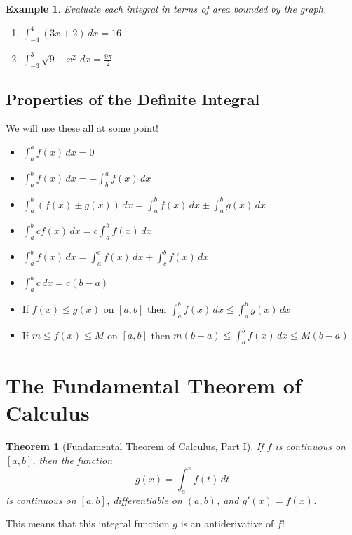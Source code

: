 \documentclass[letterpaper, 11pt, openany]{book}
\theoremstyle{mytheoremstyle}
\newtheorem{theorem}{Theorem}[section]
\theoremstyle{myexamplestyle}
\newtheorem{example}{Example}[section]
\begin{document}
\begin{example}
    Evaluate each integral in terms of area bounded by the graph.
    \begin{enumerate}
        \item \(\int_{-4}^{4} (3x + 2) \, dx = 16\)
        \item \(\int_{-3}^{3} \sqrt{9-x^{2}} \, dx = \frac{9\pi}{2}\)
    \end{enumerate}
\end{example}

\subsection{Properties of the Definite Integral}
We will use these all at some point!

\begin{itemize}
    \item \(\displaystyle \int_a^a f(x) \, dx = 0\) \faMeh
    \item \(\displaystyle \int_a^b f(x) \, dx = - \int_b^a f(x) \, dx\)
    \item \(\displaystyle \int_a^b (f(x)  \pm g(x)) \, dx = \int_a^b f(x) \, dx \pm \int_a^b g(x) \, dx\)
    \item \(\displaystyle \int_a^b c f(x) \, dx = c \int_a^b f(x) \, dx\)
    \item \(\displaystyle \int_a^b f(x) \, dx = \int_a^c f(x) \, dx + \int_c^b f(x) \, dx\)
    \item \(\displaystyle \int_a^b c \, dx = c(b-a)\)
    \item If \(f(x) \leq g(x)\) on \([a,b]\) then \(\displaystyle \int_a^b f(x) \, dx \leq \int_a^b g(x) \, dx\)
    \item If \(m \leq f(x) \leq M\) on \([a,b]\) then \(\displaystyle m(b-a) \leq \int_a^b f(x) \, dx \leq M(b-a)\)
\end{itemize}
\section{The Fundamental Theorem of Calculus}
\begin{theorem}[Fundamental Theorem of Calculus, Part I]\label{t:FTOC-I}
    If \(f\) is continuous on \([a,b]\), then the function
    \[g(x) = \int_a^x f(t) \, dt\]
    is continuous on \([a,b]\), differentiable on \((a,b)\), and \(g'(x) = f(x)\).
\end{theorem}

This means that this integral function \(g\) is an antiderivative of \(f\)!
\end{document}
